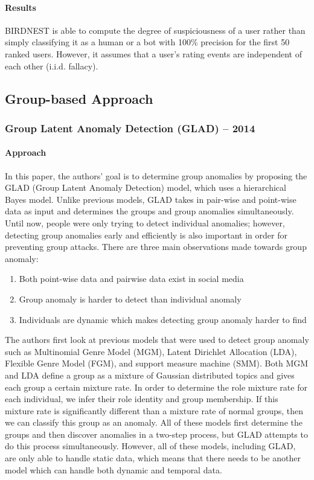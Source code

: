 \documentclass[11pt, oneside]{article}   	%
\begin{document}
\paragraph{Results}
\quad

\quad BIRDNEST is able to compute the degree of suspiciousness of a user rather than simply classifying it as a human or a bot with 100\% precision for the first 50 ranked users. However, it assumes that a user's rating events are independent of each other (i.i.d. fallacy).

\subsection{Group-based Approach}

\subsubsection{Group Latent Anomaly Detection (GLAD) -- 2014}

\paragraph{Approach}
\quad

\quad In this paper, the authors' goal is to determine group anomalies by proposing the GLAD (Group Latent Anomaly Detection) model, which uses a hierarchical Bayes model.
Unlike previous models, GLAD takes in pair-wise and point-wise data as input and determines the groups and group anomalies simultaneously.
Until now, people were only trying to detect individual anomalies; however, detecting group anomalies early and efficiently is also important in order for preventing group attacks.
There are three main observations made towards group anomaly:
\begin{enumerate}
	\item Both point-wise data and pairwise data exist in social media
	\item Group anomaly is harder to detect than individual anomaly
	\item Individuals are dynamic which makes detecting group anomaly harder to find
\end{enumerate}

\quad The authors first look at previous models that were used to detect group anomaly such as Multinomial Genre Model (MGM), Latent Dirichlet Allocation (LDA), Flexible Genre Model (FGM), and support measure machine (SMM).
Both MGM and LDA define a group as a mixture of Gaussian distributed topics and gives each group a certain mixture rate.
In order to determine the role mixture rate for each individual, we infer their role identity and group membership.
If this mixture rate is significantly different than a mixture rate of normal groups, then we can classify this group as an anomaly.
All of these models first determine the groups and then discover anomalies in a two-step process, but GLAD attempts to do this process simultaneously.
However, all of these models, including GLAD, are only able to handle static data, which means that there needs to be another model which can handle both dynamic and temporal data.
\end{document}
